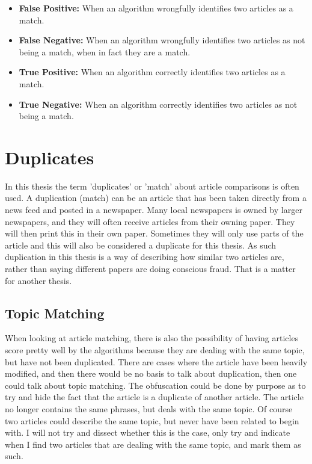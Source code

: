 \begin{itemize}
\item \textbf{False Positive:} When an algorithm wrongfully identifies two articles as a match.
\item \textbf{False Negative:} When an algorithm wrongfully identifies two articles as not being a match, when in fact they are a match.
\item \textbf{True Positive:} When an algorithm correctly identifies two articles as a match.
\item \textbf{True Negative:} When an algorithm correctly identifies two articles as not being a match.
\end{itemize}


\section{Duplicates}
In this thesis the term 'duplicates' or 'match' about article comparisons is often used. A duplication (match) can be an article that has been taken directly from a news feed and posted in a newspaper. Many local newspapers is owned by larger newspapers, and they will often receive articles from their owning paper. They will then print this in their own paper. Sometimes they will only use parts of the article and this will also be considered a duplicate for this thesis. As such duplication in this thesis is a way of describing how similar two articles are, rather than saying different papers are doing conscious fraud. That is a matter for another thesis. 

\subsection{Topic Matching}
When looking at article matching, there is also the possibility of having articles score pretty well by the algorithms because they are dealing with the same topic, but have not been duplicated. There are cases where the article have been heavily modified, and then there would be no basis to talk about duplication, then one could talk about topic matching. The obfuscation could be done by purpose as to try and hide the fact that the article is a duplicate of another article. The article no longer contains the same phrases, but deals with the same topic.
Of course two articles could describe the same topic, but never have been related to begin with. I will not try and dissect whether this is the case, only try and indicate when I find two articles that are dealing with the same topic, and mark them as such. 

